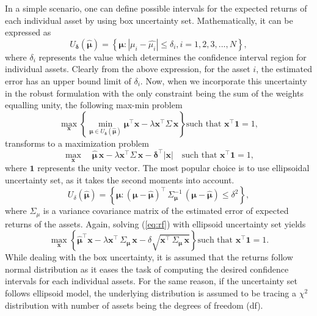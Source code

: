 \documentclass[a4paper,12pt,twoside]{article}
\begin{document}
In a simple scenario, one can define possible intervals for the expected returns of each individual asset by using box uncertainty set. Mathematically, it can be expressed as 
\begin{equation}
U_{\boldsymbol{\delta}}(\boldsymbol{\hat{\mu}}) = \left\{ \boldsymbol{\mu}: | \mu_i - \hat{\mu_i}| \leq \delta_i, i = 1,2,3,...,N \right\},    
\end{equation}
where $\delta_i$ represents the value which determines the confidence interval region for individual assets. Clearly from the above expression, for the asset $i$, the estimated error has an upper bound limit of $\delta_i$. Now, when we incorporate this uncertainty in the robust formulation with the only constraint being the sum of the weights equalling unity, the following max-min problem 
\begin{equation}
\label{eq:rf}
\max_{\mathbf{x}} \left\{ \min_{\boldsymbol{\mu} \in U_{\boldsymbol{\delta}}(\boldsymbol{\hat{\mu}})} \boldsymbol{\mu}^{\top} \mathbf{x} - \lambda \mathbf{x^{\top}}\Sigma \, \mathbf{x} \right\} \text{such that } \mathbf{x^{\top}}\mathbf{1}  = 1, 
\end{equation}
transforms to a maximization problem
\begin{equation}
\label{eqn:trans_eqn_box}
\max_\mathbf{x} \quad \boldsymbol{\hat{\mu}} \, \mathbf{x}-  \lambda \mathbf{x^{\top}}\Sigma \, \mathbf{x} - \boldsymbol{\delta}^{\top}|\mathbf{x}| \quad \text{such that } \mathbf{x^{\top}}\mathbf{1}  = 1,  
\end{equation}
where $\mathbf{1}$ represents the unity vector.
The most popular choice is to use ellipsoidal uncertainty set, as it takes the second moments into account. 
\begin{equation}
U_{\delta}(\boldsymbol{\hat{\mu}}) = \left\{ \boldsymbol{\mu} : (\boldsymbol{\mu} - \boldsymbol{\hat{\mu}})^{\top} \, \Sigma^{-1}_{\boldsymbol{\mu}} \, (\boldsymbol{\mu} - \boldsymbol{\hat{\mu}}) \leq \delta^2 \right\},
\end{equation}
where $\Sigma_\mu$ is a variance covariance matrix of the estimated error of expected returns of the assets.
Again, solving (\ref{eq:rf}) with ellipsoid uncertainty set yields
\begin{equation}
\max_{\mathbf{x}} \left\{ \boldsymbol{\hat{\mu}}^{\top} \mathbf{x} - \lambda \mathbf{x}^{\top} \, \Sigma_{\boldsymbol{\mu}} \, \mathbf{x} - \delta \sqrt{\mathbf{x}^{\top} \, \Sigma_{\boldsymbol{\mu}} \, \mathbf{x}} \right\} \text{such that } \mathbf{x^{\top}} \mathbf{1}  = 1.
\end{equation}
While dealing with the box uncertainty, it is assumed that the returns follow normal distribution as it eases the task of computing the desired confidence intervals for each individual assets. For the same reason, if the uncertainty set follows ellipsoid model, the underlying distribution is assumed to be tracing a $\chi^2$ distribution with number of assets being the degrees of freedom (df).
\end{document}
